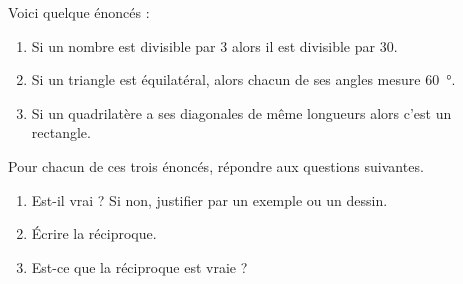 
\begin{exercice}\label{exosmath-0892}

    Voici quelque énoncés :
    \begin{enumerate}
        \item
            Si un nombre est divisible par \( 3\) alors il est divisible par \( 30\).
        \item
            Si un triangle est équilatéral, alors chacun de ses angles mesure \SI{60}{\degree}.
        \item
            Si un quadrilatère a ses diagonales de même longueurs alors c'est un rectangle.
    \end{enumerate}
    
    Pour chacun de ces trois énoncés, répondre aux questions suivantes.
    \begin{enumerate}
        \item
            Est-il vrai ? Si non, justifier par un exemple ou un dessin.
        \item
            Écrire la réciproque.
        \item
            Est-ce que la réciproque est vraie ?
    \end{enumerate}

\end{exercice}
